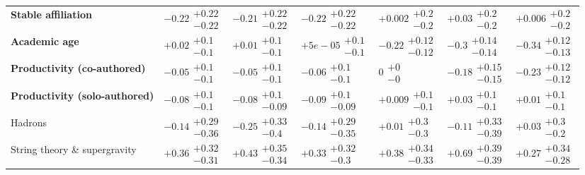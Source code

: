 \begin{table}[H]
\begin{tabular}{lllllll}
\textbf{Stable affiliation} & $-0.22\substack{+0.22 \\ -0.22}$ & $-0.21\substack{+0.22 \\ -0.22}$ & $-0.22\substack{+0.22 \\ -0.22}$ & $+0.002\substack{+0.2 \\ -0.2}$ & $+0.03\substack{+0.2 \\ -0.2}$ & $+0.006\substack{+0.2 \\ -0.2}$ \\
\textbf{Academic age} & $+0.02\substack{+0.1 \\ -0.1}$ & $+0.01\substack{+0.1 \\ -0.1}$ & $+5e-05\substack{+0.1 \\ -0.1}$ & $\bm{-0.22}\substack{+0.12 \\ -0.12}$ & $\bm{-0.3}\substack{+0.14 \\ -0.14}$ & $\bm{-0.34}\substack{+0.12 \\ -0.13}$ \\
\textbf{Productivity (co-authored)} & $-0.05\substack{+0.1 \\ -0.1}$ & $-0.05\substack{+0.1 \\ -0.1}$ & $-0.06\substack{+0.1 \\ -0.1}$ & $0\substack{+0 \\ -0}$ & $\bm{-0.18}\substack{+0.15 \\ -0.15}$ & $\bm{-0.23}\substack{+0.12 \\ -0.12}$ \\
\textbf{Productivity (solo-authored)} & $-0.08\substack{+0.1 \\ -0.1}$ & $-0.08\substack{+0.1 \\ -0.09}$ & $-0.09\substack{+0.1 \\ -0.09}$ & $+0.009\substack{+0.1 \\ -0.1}$ & $+0.03\substack{+0.1 \\ -0.1}$ & $+0.01\substack{+0.1 \\ -0.1}$ \\
\hline Hadrons & $-0.14\substack{+0.29 \\ -0.36}$ & $-0.25\substack{+0.33 \\ -0.4}$ & $-0.14\substack{+0.29 \\ -0.35}$ & $+0.01\substack{+0.3 \\ -0.3}$ & $-0.11\substack{+0.33 \\ -0.39}$ & $+0.03\substack{+0.3 \\ -0.2}$ \\
String theory \& supergravity & $\bm{+0.36}\substack{+0.32 \\ -0.31}$ & $\bm{+0.43}\substack{+0.35 \\ -0.34}$ & $\bm{+0.33}\substack{+0.32 \\ -0.3}$ & $\bm{+0.38}\substack{+0.34 \\ -0.33}$ & $\bm{+0.69}\substack{+0.39 \\ -0.39}$ & $+0.27\substack{+0.34 \\ -0.28}$ \\

\end{tabular}
\end{table}
